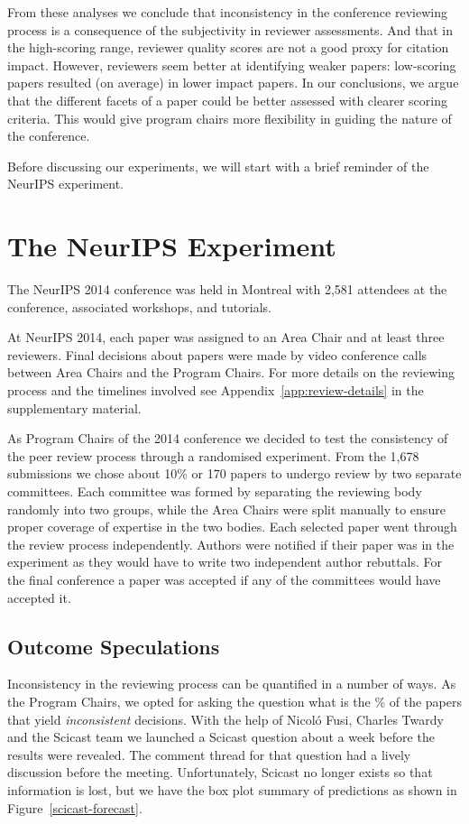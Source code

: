 \documentclass[twoside]{article}
\begin{document}
From these analyses we conclude that inconsistency in the conference
reviewing process is a consequence of the subjectivity in reviewer
assessments. And that in the high-scoring range, reviewer quality
scores are not a good proxy for citation impact. However, reviewers
seem better at identifying weaker papers: low-scoring papers resulted (on
average) in lower impact papers. In our conclusions, we argue that the different
facets of a paper could be better assessed with clearer scoring
criteria. This would give program chairs more flexibility in guiding
the nature of the conference.


Before discussing our experiments, we will start with a brief
reminder of the NeurIPS experiment.

\section{The NeurIPS Experiment}
\label{review-of-the-conference-and-the-experiment}

The NeurIPS 2014 conference was held in Montreal with 2,581 attendees at the
conference, associated workshops, and tutorials. 

At NeurIPS 2014, each paper was assigned to an Area Chair and at least
three reviewers. Final decisions about papers were made by video
conference calls between Area Chairs and the Program Chairs. For more details
on the reviewing process and the timelines involved see
Appendix~\ref{app:review-details} in the supplementary material. 

As Program Chairs of the 2014 conference we decided to test the
consistency of the peer review process through a randomised experiment.
From the 1,678 submissions we chose about 10\% or 170 papers to undergo review by
two separate committees. Each committee was formed by separating the
reviewing body randomly into two groups, while the Area Chairs were
split manually to ensure proper coverage of expertise in the two bodies.
Each selected paper went through the review process
independently. Authors were notified if their paper was in the
experiment as they would have to write two independent author
rebuttals. For the final conference a paper was accepted if any of the
committees would have accepted it. 

\subsection{Outcome Speculations}

Inconsistency in the reviewing process can be quantified in a number
of ways. As the Program Chairs, we opted for asking the question what is the
\% of the papers that yield \emph{inconsistent} decisions.
With the help of Nicol\'o Fusi, Charles Twardy and
the Scicast team we launched a
Scicast question about a week before the results were revealed.  The comment
thread for that question had a lively discussion before the
meeting. Unfortunately, Scicast no longer exists so that information is lost, but we have the box plot summary of predictions as shown in Figure~\ref{scicast-forecast}. 
\end{document}

